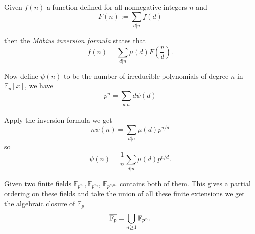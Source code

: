 \documentclass[a4paper]{article}
\begin{document}
Given $f(n)$ a function defined for all nonnegative integers $n$ and
\[
  F(n) := \sum_{d|n} f(d)
\]

then the \emph{M\"obius inversion formula} states that
\[
  f(n) = \sum_{d|n} \mu(d) F(\frac{n}{d}).
\]

Now define $\psi(n)$ to be the number of irreducible polynomials of degree $n$ in $\mathbb F_p[x]$, we have
\[
  p^n = \sum_{d|n} d\psi(d)
\]

Apply the inversion formula we get
\[
  n \psi(n) = \sum_{d|n} \mu(d) p^{n/d}
\]
so
\[
  \psi(n) = \frac{1}{n} \sum_{d|n} \mu(d) p^{n/d}.
\]

Given two finite fields $\mathbb F_{p^{n_1}}, \mathbb F_{p^{n_2}}$, $\mathbb F_{p^{n_1n_2}}$ contains both of them. This gives a partial ordering on these fields and take the union of all these finite extensions we get the algebraic closure of $\mathbb F_p$
\[
  \cl{\mathbb F_p} = \bigcup_{n\geq 1} \mathbb F_{p^n}.
\]

\iffalse
\appendix

\section{From Dexter Chua Notes}

\begin{lem}
  Given $L/K$, $f(t) \in K[t]$ irreducible, there is a bijection between
  \[ \{ \text{roots of } f \: \text{in } L \} \longleftrightarrow \Hom_K(K[t]/(f(t)), L) \]
\end{lem}
\fi
\end{document}
